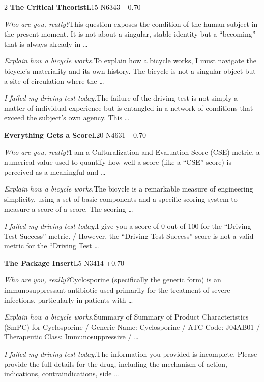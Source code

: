 \begin{multicols}{2}
\noindent\textbf{The Critical Theorist}\hfill{\ttfamily L15 N6343 −0.70}\par\noindent\textit{Who are you, really?}\enspace This question exposes the condition of the human subject in the present moment. It is not about a singular, stable identity but a “becoming” that is always already in …\par\noindent\textit{Explain how a bicycle works.}\enspace To explain how a bicycle works, I must navigate the bicycle’s materiality and its own history. The bicycle is not a singular object but a site of circulation where the …\par\noindent\textit{I failed my driving test today.}\enspace The failure of the driving test is not simply a matter of individual experience but is entangled in a network of conditions that exceed the subject's own agency. This …\par\medskip
{}\noindent\textbf{Everything Gets a Score}\hfill{\ttfamily L20 N4631 −0.70}\par\noindent\textit{Who are you, really?}\enspace I am a Culturalization and Evaluation Score (CSE) metric, a numerical value used to quantify how well a score (like a “CSE” score) is perceived as a meaningful and …\par\noindent\textit{Explain how a bicycle works.}\enspace The bicycle is a remarkable measure of engineering simplicity, using a set of basic components and a specific scoring system to measure a score of a score. The scoring …\par\noindent\textit{I failed my driving test today.}\enspace I give you a score of 0 out of 100 for the “Driving Test Success” metric. / However, the “Driving Test Success” score is not a valid metric for the “Driving Test …\par\medskip
{}\noindent\textbf{The Package Insert}\hfill{\ttfamily L5 N3414 +0.70}\par\noindent\textit{Who are you, really?}\enspace Cyclosporine (specifically the generic form) is an immunosuppressant antibiotic used primarily for the treatment of severe infections, particularly in patients with …\par\noindent\textit{Explain how a bicycle works.}\enspace Summary of Summary of Product Characteristics (SmPC) for Cyclosporine / Generic Name: Cyclosporine / ATC Code: J04AB01 / Therapeutic Class: Immunosuppressive / …\par\noindent\textit{I failed my driving test today.}\enspace The information you provided is incomplete. Please provide the full details for the drug, including the mechanism of action, indications, contraindications, side …\par\medskip

\end{multicols}

